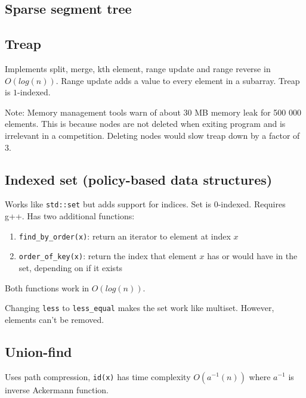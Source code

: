 \documentclass{article}
\begin{document}


\subsection {Sparse segment tree}

\subsection {Treap}

Implements split, merge, kth element, range update and range reverse in $O(log(n))$. Range update adds a value to every element in a subarray. Treap is $1$-indexed.

Note: Memory management tools warn of about 30 MB memory leak for 500 000 elements. This is because nodes are not deleted when exiting program and is irrelevant in a competition. Deleting nodes would slow treap down by a factor of 3.



\subsection {Indexed set (policy-based data structures)}

Works like \texttt{std::set} but adds support for indices. Set is 0-indexed. Requires g++. Has two additional functions:

\begin{enumerate}
	\item \verb|find_by_order(x)|: return an iterator to element at index $x$
	\item \verb|order_of_key(x)|: return the index that element $x$ has or would have in the set, depending on if it exists
\end{enumerate}

Both functions work in $O(log(n))$.

Changing \texttt{less} to \verb|less_equal| makes the set work like multiset. However, elements can't be removed.



\subsection{Union-find}

Uses path compression, \texttt{id(x)} has time complexity $O(a^{-1}(n))$ where $a^{-1}$ is inverse Ackermann function.
\end{document}
